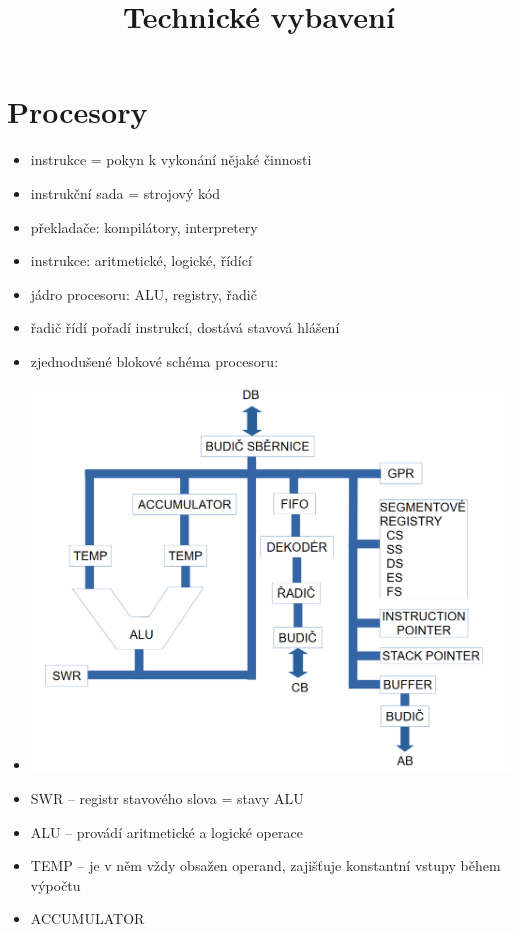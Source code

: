 \documentclass[a4paper,12pt]{article}
\title{Technické vybavení}
\author{}
\date{}
\providecommand{\tightlist}{%
\setlength{\itemsep}{0pt}\setlength{\parskip}{0pt}}
\begin{document}
\maketitle

\section{Procesory}

\begin{itemize}
\tightlist
\item instrukce = pokyn k vykonání nějaké činnosti
\item instrukční sada = strojový kód
\item překladače: kompilátory, interpretery
\item instrukce: aritmetické, logické, řídící
\item jádro procesoru: ALU, registry, řadič
\item řadič řídí pořadí instrukcí, dostává stavová hlášení
\item zjednodušené blokové schéma procesoru:
\item[] \includegraphics[width=15.778cm]{ref/blokove-schema-procesoru.png}
\item SWR -- registr stavového slova = stavy ALU
\item ALU -- provádí aritmetické a logické operace
\item TEMP -- je v něm vždy obsažen operand, zajišťuje konstantní vstupy
  během výpočtu
\item ACCUMULATOR


\end{itemize}
\end{document}
